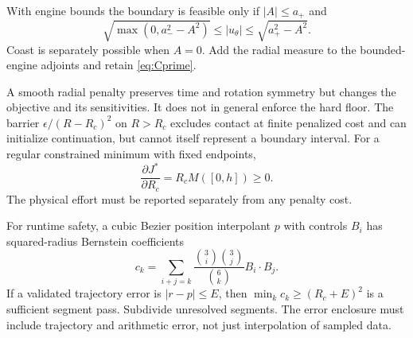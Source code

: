 With engine bounds the boundary is feasible only if $|A|\le a_+$ and
\begin{equation}
 \sqrt{\max(0,a_-^2-A^2)}
 \le |u_\theta|\le\sqrt{a_+^2-A^2}.
\end{equation}
Coast is separately possible when $A=0$. Add the radial measure to
the bounded-engine adjoints and retain \eqref{eq:Cprime}.

A smooth radial penalty preserves time and rotation symmetry but
changes the objective and its sensitivities. It does not in general
enforce the hard floor. The barrier $\epsilon/(R-R_c)^2$ on
$R>R_c$ excludes contact at finite penalized cost and can initialize
continuation, but cannot itself represent a boundary interval.
For a regular constrained minimum with fixed endpoints,
\begin{equation}
 \frac{\partial J^*}{\partial R_c}=R_cM([0,h])\ge0.
\end{equation}
The physical effort must be reported separately from any penalty cost.

For runtime safety, a cubic Bezier position interpolant $p$ with
controls $B_i$ has squared-radius Bernstein coefficients
\begin{equation}
 c_k=\sum_{i+j=k}
 \frac{\binom3i\binom3j}{\binom6k}B_i\cdot B_j.
\end{equation}
If a validated trajectory error is $|r-p|\le E$, then
$\min_k c_k\ge(R_c+E)^2$ is a sufficient segment pass.
Subdivide unresolved segments. The error enclosure must include
trajectory and arithmetic error, not just interpolation of sampled data.
